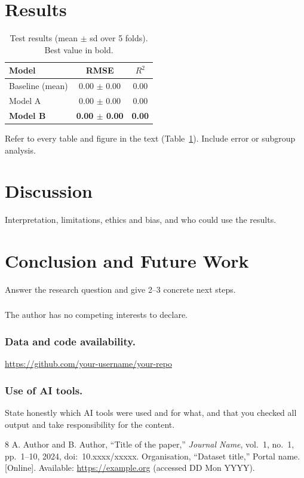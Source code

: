 \documentclass[runningheads]{llncs}
\begin{document}
\section{Results}
\begin{table}[htbp]
\centering
\caption{Test results (mean $\pm$ sd over 5 folds). Best value in bold.}
\label{tab:results}
\begin{tabular}{lcc}
\toprule
Model & RMSE & $R^2$ \\
\midrule
Baseline (mean) & 0.00 $\pm$ 0.00 & 0.00 \\
Model A         & 0.00 $\pm$ 0.00 & 0.00 \\
\textbf{Model B} & \textbf{0.00 $\pm$ 0.00} & \textbf{0.00} \\
\bottomrule
\end{tabular}
\end{table}
Refer to every table and figure in the text (Table~\ref{tab:results}). Include error or subgroup analysis.

\section{Discussion}
Interpretation, limitations, ethics and bias, and who could use the results.

\section{Conclusion and Future Work}
Answer the research question and give 2--3 concrete next steps.

\begin{credits}
\subsubsection{\discintname}
The author has no competing interests to declare.

\subsubsection{Data and code availability.} \url{https://github.com/your-username/your-repo}

\subsubsection{Use of AI tools.} State honestly which AI tools were used and for what,
and that you checked all output and take responsibility for the content.
\end{credits}

\begin{thebibliography}{8}
 A. Author and B. Author, ``Title of the paper,'' \emph{Journal Name}, vol.~1, no.~1, pp.~1--10, 2024, doi:~10.xxxx/xxxxx.
 Organisation, ``Dataset title,'' Portal name. [Online]. Available: \url{https://example.org} (accessed DD Mon YYYY).
\end{thebibliography}
\end{document}
